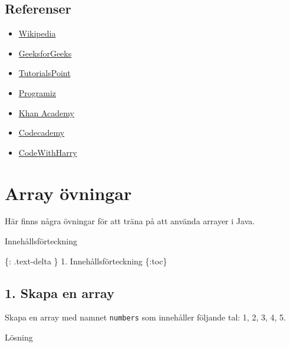 \hypertarget{referenser}{%
\subsection{Referenser}\label{referenser}}

\begin{itemize}
\tightlist
\item
  \href{https://en.wikipedia.org/wiki/Data_structure}{Wikipedia}
\item
  \href{https://www.geeksforgeeks.org/data-structures/}{GeeksforGeeks}
\item
  \href{https://www.tutorialspoint.com/data_structures_algorithms/index.htm}{TutorialsPoint}
\item
  \href{https://www.programiz.com/dsa}{Programiz}
\item
  \href{https://www.khanacademy.org/computing/computer-science/algorithms}{Khan
  Academy}
\item
  \href{https://www.codecademy.com/learn/learn-data-structures}{Codecademy}
\item
  \href{https://www.youtube.com/playlistlist=PLu0W_9lII9agICnT8t4iYVSZ3eykIAOME}{CodeWithHarry}
\end{itemize}

\hypertarget{array-uxf6vningar}{%
\section{Array övningar}\label{array-uxf6vningar}}

Här finns några övningar för att träna på att använda arrayer i Java.

Innehållsförteckning

\{: .text-delta \} 1. Innehållsförteckning \{:toc\}

\hypertarget{skapa-en-array}{%
\subsection{1. Skapa en array}\label{skapa-en-array}}

Skapa en array med namnet \texttt{numbers} som innehåller följande tal:
1, 2, 3, 4, 5.

Lösning

\hypertarget{cb1}{}
\begin{Shaded}
\begin{Highlighting}[]
\OperatorTok{[]}\OperatorTok{=} \OperatorTok{\{}\OperatorTok{,} \OperatorTok{,} \OperatorTok{,} \OperatorTok{,} \OperatorTok{\};}
\end{Highlighting}
\end{Shaded}

